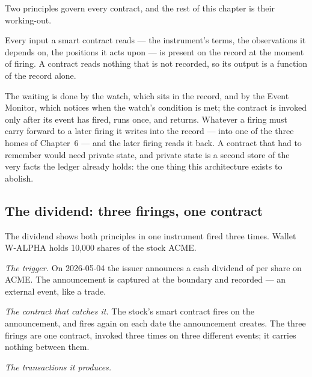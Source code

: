 Two principles govern every contract, and the rest of this chapter is their
working-out.

\begin{principle}
Every input a smart contract reads --- the instrument's terms, the observations
it depends on, the positions it acts upon --- is present on the record at the
moment of firing. A contract reads nothing that is not recorded, so its output
is a function of the record alone.
\end{principle}

\begin{principle}
The waiting is done by the watch, which sits in the record, and by the Event
Monitor, which notices when the watch's condition is met; the contract is
invoked only after its event has fired, runs once, and returns. Whatever a
firing must carry forward to a later firing it writes into the record --- into
one of the three homes of Chapter~6 --- and the later firing reads it back. A
contract that had to remember would need private state, and private state is a
second store of the very facts the ledger already holds: the one thing this
architecture exists to abolish.
\end{principle}

\subsection{The dividend: three firings, one contract}

The dividend shows both principles in one instrument fired three times. Wallet
W-ALPHA holds 10{,}000 shares of the stock ACME.

\emph{The trigger.} On 2026-05-04 the issuer announces a cash dividend of
 per share on ACME. The announcement is captured at the boundary and
recorded --- an external event, like a trade.

\emph{The contract that catches it.} The stock's smart contract fires on the
announcement, and fires again on each date the announcement creates. The three
firings are one contract, invoked three times on three different events; it
carries nothing between them.

\emph{The transactions it produces.}

